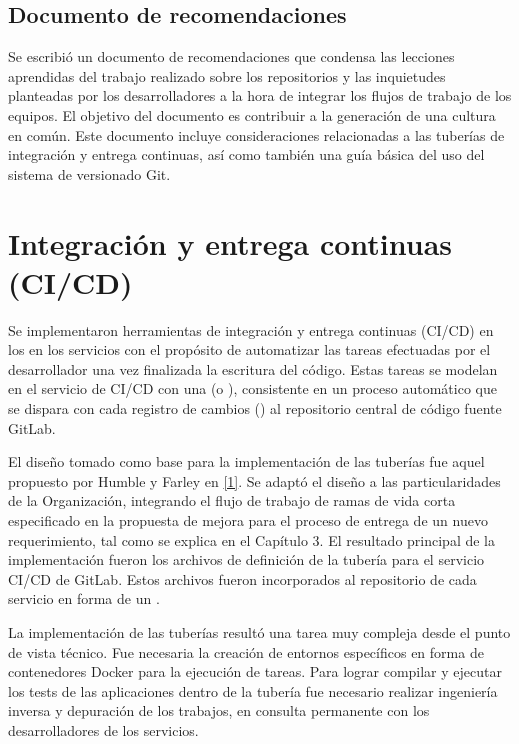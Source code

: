 \subsection{Documento de recomendaciones}

Se escribió un documento de recomendaciones que condensa las lecciones
aprendidas del trabajo realizado sobre los repositorios y las
inquietudes planteadas por los desarrolladores a la hora de integrar
los flujos de trabajo de los equipos. El objetivo del documento es
contribuir a la generación de una cultura en común. Este documento
incluye consideraciones relacionadas a las tuberías de integración y
entrega continuas, así como también una guía básica del uso del
sistema de versionado Git.

\section{Integración y entrega continuas (CI/CD)}

Se implementaron herramientas de integración y entrega continuas
(CI/CD) en los en los servicios con el propósito de automatizar las
tareas efectuadas por el desarrollador una vez finalizada la escritura
del código. Estas tareas se modelan en el servicio de CI/CD con una
 (o ), consistente en un proceso
automático que se dispara con cada registro de cambios ()
al repositorio central de código fuente GitLab.

El diseño tomado como base para la implementación de las tuberías fue
aquel propuesto por Humble y Farley en
\href{https://www.zotero.org/google-docs/?9SSytI}{[1]}. Se adaptó el
diseño a las particularidades de la Organización, integrando el flujo
de trabajo de ramas de vida corta especificado en la propuesta de
mejora para el proceso de entrega de un nuevo requerimiento, tal como
se explica en el Capítulo 3. El resultado principal de la
implementación fueron los archivos de definición de la tubería para el
servicio CI/CD de GitLab. Estos archivos fueron incorporados al
repositorio de cada servicio en forma de un .

La implementación de las tuberías resultó una tarea muy compleja desde
el punto de vista técnico. Fue necesaria la creación de entornos
específicos en forma de contenedores Docker para la ejecución de
tareas. Para lograr compilar y ejecutar los tests de las aplicaciones
dentro de la tubería fue necesario realizar ingeniería inversa y
depuración de los trabajos, en consulta permanente con los
desarrolladores de los servicios.

